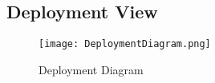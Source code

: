 \subsection{Deployment View}

\begin{figure}[H]
\caption{Deployment Diagram}
\label{fig:Deployment}
\centering
\texttt{[image: DeploymentDiagram.png]}
\end{figure}

